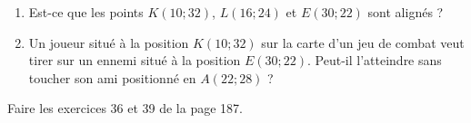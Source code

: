 
\begin{exercice}\label{exosmath-0623}

    \begin{enumerate}
        \item
            Est-ce que les points \( K(10;32)\), \( L(16;24)\) et \( E(30;22)\) sont alignés ?
        \item
    Un joueur situé à la position \( K(10;32)\) sur la carte d'un jeu de combat veut tirer sur un ennemi situé à la position \( E(30;22)\). Peut-il l'atteindre sans toucher son ami positionné en \( A(22;28)\) ?
            
    \end{enumerate}

    Faire les exercices 36 et 39 de la page 187.

\end{exercice}
